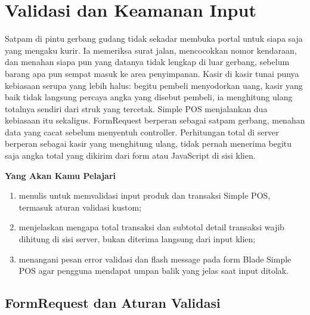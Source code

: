 
\chapter{Validasi dan Keamanan Input}
\label{ch:validasi-input}


Satpam di pintu gerbang gudang tidak sekadar membuka portal untuk siapa
saja yang mengaku kurir. Ia memeriksa surat jalan, mencocokkan nomor
kendaraan, dan menahan siapa pun yang datanya tidak lengkap di luar
gerbang, sebelum barang apa pun sempat masuk ke area penyimpanan. Kasir
di kasir tunai punya kebiasaan serupa yang lebih halus: begitu pembeli
menyodorkan uang, kasir yang baik tidak langsung percaya angka yang
disebut pembeli, ia menghitung ulang totalnya sendiri dari struk yang
tercetak. Simple POS menjalankan dua kebiasaan itu sekaligus. FormRequest
berperan sebagai satpam gerbang, menahan data yang cacat sebelum
menyentuh controller. Perhitungan total di server berperan sebagai kasir
yang menghitung ulang, tidak pernah menerima begitu saja angka total
yang dikirim dari form atau JavaScript di sisi klien.

\textbf{Yang Akan Kamu Pelajari}

\begin{enumerate}
  \item menulis  untuk memvalidasi input produk dan transaksi Simple POS, termasuk aturan validasi kustom;
  \item menjelaskan mengapa total transaksi dan subtotal detail transaksi wajib dihitung di sisi server, bukan diterima langsung dari input klien;
  \item menangani pesan error validasi dan flash message pada form Blade Simple POS agar pengguna mendapat umpan balik yang jelas saat input ditolak.
\end{enumerate}

\section{FormRequest dan Aturan Validasi}
\label{sec:validasi-input-1}

